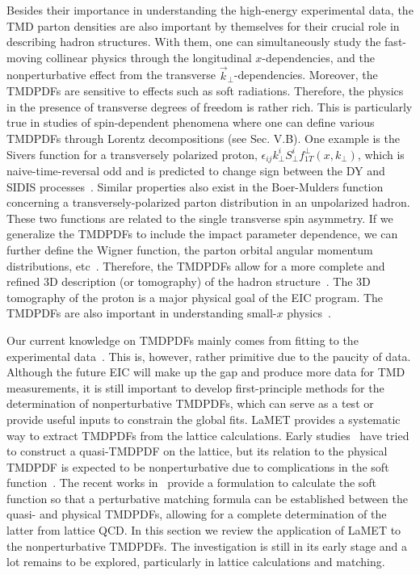 \documentclass[aps,rmp,reprint,amsmath,amssymb,graphicx,longbibliography]{revtex4-1} %
\begin{document}
Besides their importance in understanding the high-energy experimental data, the TMD parton densities are also important by themselves for their crucial role in describing hadron structures. With them, one can simultaneously study the fast-moving collinear physics through the longitudinal $x$-dependencies, and the nonperturbative effect from the transverse $\vec{k}_\perp$-dependencies. Moreover, the TMDPDFs are sensitive to effects such as soft radiations. Therefore, the physics in the presence of transverse degrees of freedom is rather rich. This is particularly true in studies of spin-dependent phenomena where one can define various TMDPDFs through Lorentz decompositions (see Sec. V.B). One example is the Sivers function for a transversely polarized proton, $\epsilon_{ij}k^i_\perp S^i_\perp f^{\perp}_{1T}(x,k_\perp)$, which is naive-time-reversal odd and is predicted to change sign between the DY and SIDIS processes~\cite{Collins:2011zzd}. Similar properties also exist in the Boer-Mulders function~\cite{Boer:1997nt} concerning a transversely-polarized parton
distribution in an unpolarized hadron. These two functions are related to the single transverse spin asymmetry. If we generalize the TMDPDFs to include the impact parameter dependence, we can further define the Wigner function, the parton orbital angular momentum distributions, etc~\cite{Belitsky:2003nz, Lorce:2011ni}. Therefore, the TMDPDFs allow for a more complete and refined 3D description (or tomography) of the hadron structure~\cite{Burkardt:2000za, Boer:2011fh}.
The 3D tomography of the proton is a major physical goal of the EIC program. The TMDPDFs are also important
in understanding small-$x$ physics~\cite{Kuraev:1977fs,Balitsky:1978ic,Balitsky:1995ub,Kovchegov:1999yj,Kovchegov:2012mbw}.

Our current knowledge on TMDPDFs mainly comes from fitting to the experimental data~\cite{Landry:1999an,Konychev:2005iy,Su:2014wpa,Echevarria:2014xaa,Kang:2015msa,Bacchetta:2017gcc,Scimemi:2017etj,Bertone:2019nxa,Scimemi:2019cmh,Bacchetta:2019sam}. This is, however, rather primitive due to the paucity of data. Although the future EIC will make up the gap and produce more data for TMD measurements, it is still important to develop first-principle methods for the determination of nonperturbative TMDPDFs, which can serve as a test or provide useful inputs to constrain the global fits.
LaMET provides a systematic way to extract TMDPDFs from the lattice calculations. Early studies~\cite{Ji:2014hxa,Ji:2018hvs,Ebert:2018gzl,Ebert:2019okf} have tried to construct a quasi-TMDPDF on the lattice, but its relation to the physical TMDPDF is expected to be nonperturbative due to complications in the soft function~\cite{Ebert:2019okf}. The recent works in~\cite{Ji:2019sxk,Ji:2019ewn} provide a formulation
to calculate the soft function so that a perturbative matching formula can be established between the quasi- and physical TMDPDFs, allowing for a complete determination of the latter from lattice QCD. In this section we review the application of LaMET to the nonperturbative TMDPDFs. The investigation is still in its early stage and a lot remains
to be explored, particularly in lattice calculations and matching.
\end{document}
